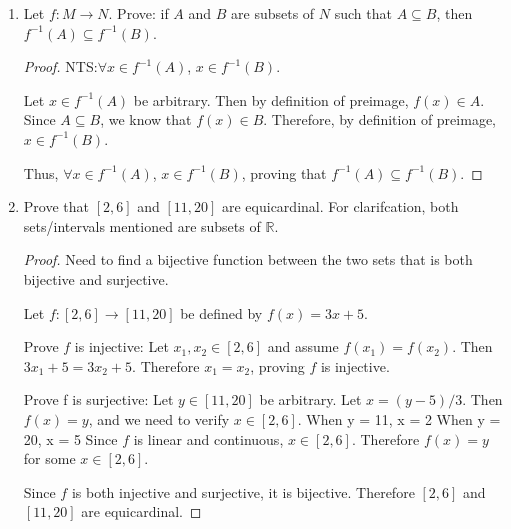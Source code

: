 \documentclass{article}
\begin{document}
\begin{enumerate}
\begin{proof}
              Thus, for all $m_1, m_2 \in M$, if $(g \circ f)(m_1) = (g \circ f)(m_2)$, then
              $m_1 = m_2$, proving that $g \circ f$ is injective.
          \end{proof}

          \newpage

    \item Let $f : M \to N$. Prove: if $A$ and $B$ are subsets of $N$ such that $A
              \subseteq B$, then $f^{-1}(A) \subseteq f^{-1}(B)$.

          \begin{proof}
              NTS:\@ $\forall x \in f^{-1}(A)$, $x \in f^{-1}(B)$.

              Let $x \in f^{-1}(A)$ be arbitrary. Then by definition of preimage, $f(x) \in
                  A$. Since $A \subseteq B$, we know that $f(x) \in B$. Therefore, by definition
              of preimage, $x \in f^{-1}(B)$.

              Thus, $\forall x \in f^{-1}(A)$, $x \in f^{-1}(B)$, proving that $f^{-1}(A)
                  \subseteq f^{-1}(B)$.
          \end{proof}

          \newpage

    \item Prove that $[2,6]$ and $[11,20]$ are equicardinal. For clarifcation, both
          sets/intervals mentioned are subsets of $\mathbb{R}$.

          \begin{proof}
              Need to find a bijective function between the two sets that is both bijective and surjective.

              Let $f: [2,6] \rightarrow [11,20]$ be defined by $f(x) = 3x + 5$.

              Prove $f$ is injective: Let $x_1, x_2 \in [2,6]$ and assume $f(x_1) = f(x_2)$.
              Then $3x_1 + 5 = 3x_2 + 5$. Therefore $x_1 = x_2$, proving $f$ is injective.

              Prove f is surjective: Let $y \in [11,20]$ be arbitrary. Let $x = (y-5)/3$.
              Then $f(x) = y$, and we need to verify $x \in [2,6]$. When y = 11, x = 2 When y
              = 20, x = 5 Since $f$ is linear and continuous, $x \in [2,6]$. Therefore $f(x)
                  = y$ for some $x \in [2,6]$.

              Since $f$ is both injective and surjective, it is bijective. Therefore $[2,6]$
              and $[11,20]$ are equicardinal.
          \end{proof}


\end{enumerate}
\end{document}
